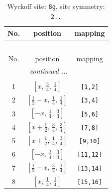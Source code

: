 \documentclass[fleqn,8pt]{jsarticle}
\begin{document}
\renewcommand{\arraystretch}{1.2}
\begin{longtable}{ccc}
\caption{Wyckoff site: {\tt 8g}, site symmetry: {\tt 2..}}
 \\
 \hline \hline
No. & position & mapping \\ \hline \endfirsthead

\multicolumn{2}{l}{\tablename\ \thetable{}} \\
 \hline \hline
No. & position & mapping \\ \hline \endhead

 \hline \hline
\multicolumn{2}{r}{\footnotesize\it continued ...} \\ \endfoot

 \hline \hline
\multicolumn{2}{r}{} \\ \endlastfoot

1 & $\left[ x,\, \frac{3}{4},\, \frac{1}{4} \right]$ & {\tt [1,2]} \\ \hline
2 & $\left[ \frac{1}{2} - x,\, \frac{1}{4},\, \frac{1}{4} \right]$ & {\tt [3,4]} \\ \hline
3 & $\left[ - x,\, \frac{1}{4},\, \frac{3}{4} \right]$ & {\tt [5,6]} \\ \hline
4 & $\left[ x + \frac{1}{2},\, \frac{3}{4},\, \frac{3}{4} \right]$ & {\tt [7,8]} \\ \hline
5 & $\left[ x + \frac{1}{2},\, \frac{1}{4},\, \frac{3}{4} \right]$ & {\tt [9,10]} \\ \hline
6 & $\left[ - x,\, \frac{3}{4},\, \frac{3}{4} \right]$ & {\tt [11,12]} \\ \hline
7 & $\left[ \frac{1}{2} - x,\, \frac{3}{4},\, \frac{1}{4} \right]$ & {\tt [13,14]} \\ \hline
8 & $\left[ x,\, \frac{1}{4},\, \frac{1}{4} \right]$ & {\tt [15,16]} \\
\end{longtable}
\renewcommand{\arraystretch}{1.2}
\end{document}
